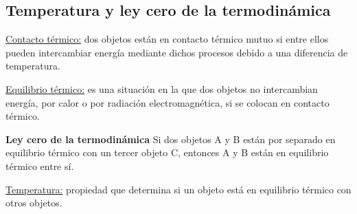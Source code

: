 \subsection{Temperatura y ley cero de la termodinámica}

  \PN \underline{Contacto térmico:} dos objetos están en contacto térmico mutuo si entre ellos pueden intercambiar
  energía mediante dichos procesos debido a una diferencia de temperatura.

  \vspace{3mm}
  \PN \underline{Equilibrio térmico:} es una situación en la que dos objetos no intercambian energía, por calor o por
  radiación electromagnética, si se colocan en contacto térmico.

  \vspace{3mm}
  \PN \textbf{Ley cero de la termodinámica}
  \PN Si dos objetos A y B están por separado en equilibrio térmico con un tercer objeto C, entonces A y B están en
  equilibrio térmico entre sí.

  \vspace{3mm}
  \PN \underline{Temperatura:} propiedad que determina si un objeto está en equilibrio térmico con otros objetos.
